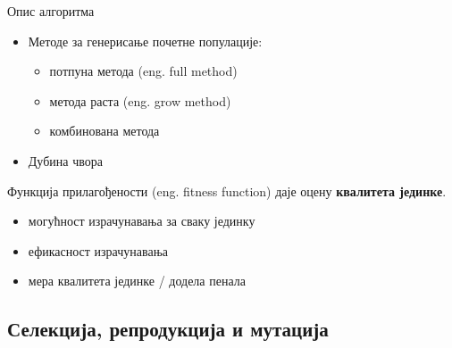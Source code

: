 \documentclass{beamer}
\begin{document}
\begin{frame}{Опис алгоритма}
    \begin{itemize}
        \item Методе за генерисање почетне популације:
        \begin{itemize}
            \item потпуна метода (eng. full method)
            \item метода раста (eng. grow method)
            \item комбинована метода
        \end{itemize}
        \item Дубина чвора
    \end{itemize}
    Функција прилагођености (eng. fitness function) даје оцену \textbf{квалитета јединке}.
    \begin{itemize}
        \item могућност израчунавања за сваку јединку
        \item ефикасност израчунавања
        \item мера квалитета јединке / додела пенала
    \end{itemize}
\end{frame}
    
\subsection[Селекција, репродукција и мутација]{Селекција, репродукција и мутација}
\end{document}

